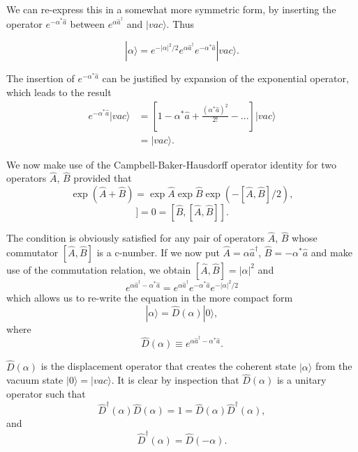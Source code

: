 {We can re-express this in a somewhat more symmetric form, by inserting the operator $e^{-\alpha^{*}\hat{a}}$ between $e^{\alpha\hat{a}^{\dagger}}$ and $|vac\rangle$. Thus

    


\begin{equation} |\alpha\rangle=e^{-|\alpha|^{2}/2}e^{\alpha\hat{a}^{\dagger}}e^{-\alpha^{*}\hat{a}}|vac\rangle. \end{equation}



The insertion of $e^{-\alpha^{*}\hat{a}}$ can be justified by expansion of the exponential operator, which leads to the result
\begin{align*}
e^{-\alpha^{*}\hat{a}}|vac\rangle &= \left[1-\alpha^{*}\hat{a}+\frac{(\alpha^{*}\hat{a})^{2}}{2!}-...\right]|vac\rangle \\
&= |vac\rangle.
\end{align*}

We now make use of the Campbell-Baker-Hausdorff operator identity for two operators $\hat{A}$, $\hat{B}$ provided that
\begin{equation*} \exp(\hat{A}+\hat{B})=\exp\hat{A}\exp\hat{B}\exp(-[\hat{A},\hat{B}]/2), \end{equation*}
\begin{equation*} [\hat{A},[\hat{A},\hat{B}]]=0=[\hat{B},[\hat{A},\hat{B}]]. \end{equation*}

The condition is obviously satisfied for any pair of operators $\hat{A}$, $\hat{B}$ whose commutator $[\hat{A}, \hat{B}]$ is a c-number. If we now put $\hat{A}=\alpha\hat{a}^{\dagger}$, $\hat{B}=-\alpha^{*}\hat{a}$ and make use of the commutation relation, we obtain $[\hat{A},\hat{B}]=|\alpha|^{2}$ and
\begin{equation*} e^{\alpha\hat{a}^{\dagger}-\alpha^{*}\hat{a}}=e^{\alpha\hat{a}^{\dagger}}e^{-\alpha^{*}\hat{a}}e^{-|\alpha|^{2}/2} \end{equation*}
which allows us to re-write the equation in the more compact form
\begin{equation} |\alpha\rangle=\hat{D}(\alpha)|0\rangle \label{eq:displacementoperator}, \end{equation}
where
\begin{equation*} \hat{D}(\alpha)\equiv e^{\alpha\hat{a}^{\dagger}-\alpha^{*}\hat{a}}. \end{equation*}

$\hat{D}(\alpha)$ is the displacement operator that creates the coherent state $|\alpha\rangle$ from the vacuum state $|0\rangle=|vac\rangle$. It is clear by inspection that $\hat{D}(\alpha)$ is a unitary operator such that
\begin{equation*} \hat{D}^{\dagger}(\alpha)\hat{D}(\alpha)=1=\hat{D}(\alpha)\hat{D}^{\dagger}(\alpha), \end{equation*}
and
\begin{equation*} \hat{D}^{\dagger}(\alpha)=\hat{D}(-\alpha). \end{equation*}


}
